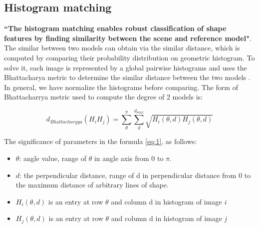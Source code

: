 \subsection{Histogram matching}
\textbf{``The histogram matching enables robust classification of shape features by finding similarity between the scene and reference model"}\cite{palaniswamy2010automatic}. The similar between two models can obtain via the similar distance, which is computed by comparing their probability distribution on geometric histogram. To solve it, each image is represented by a global pairwise histograms and uses the Bhattacharya\cite{thacker1995assessing} metric to determine the similar distance between the two models \cite{palaniswamy2010automatic}. In general, we have normalize the histograms before comparing. The form of Bhattacharrya metric used to compute the degree of 2 models is:
\begin{center}
\begin{equation} \label{eq:1}
d_{Bhattacharyya} (H_{i}H_{j}) = \sum\limits_{\theta}^{\pi}\sum\limits_{d}^{d_{max}}\sqrt{H_{i}(\theta,d)H_{j}(\theta,d)}
\end{equation}
\end{center}
The significance of parameters in the formula \ref{eq:1}, as follows:
\begin{itemize}
\item $\theta$: angle value, range of $\theta$ in angle axis from 0 to $\pi$.
\item $d$: the perpendicular distance, range of d in perpendicular distance from 0 to the maximum distance of arbitrary lines of shape.
\item $H_{i}(\theta,d)$ is an entry at row $\theta$ and column d in histogram of image \textit{i}
\item $H_{j}(\theta,d)$ is an entry at row $\theta$ and column d in histogram of image \textit{j}
\end{itemize}~

